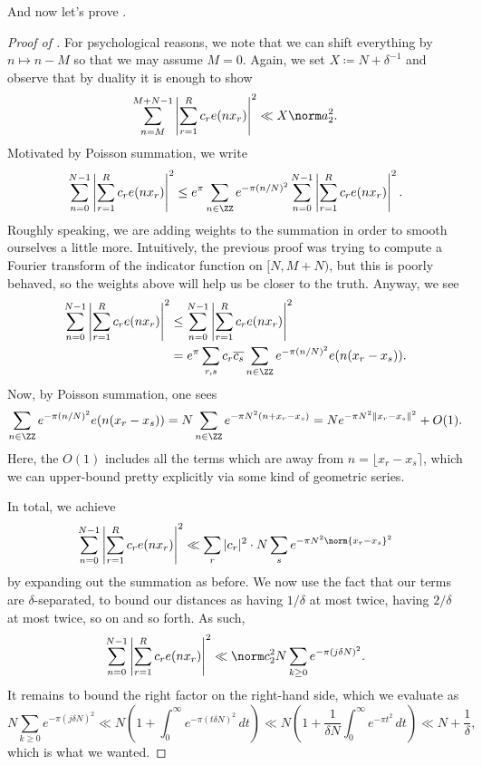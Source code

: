 \documentclass[../notes.tex]{subfiles}
\begin{document}
And now let's prove .
\begin{proof}[Proof of ]
	For psychological reasons, we note that we can shift everything by $n\mapsto n-M$ so that we may assume $M=0$. Again, we set $X\coloneqq N+\delta^{-1}$ and observe that by duality it is enough to show
	\[\sum_{n=M}^{M+N-1}\left|\sum_{r=1}^Rc_re(nx_r)\right|^2\ll X\norm a_2^2.\]
	Motivated by Poisson summation, we write
	\[\sum_{n=0}^{N-1}\left|\sum_{r=1}^Rc_re(nx_r)\right|^2\le e^\pi\sum_{n\in\ZZ}e^{-\pi(n/N)^2}\sum_{n=0}^{N-1}\left|\sum_{r=1}^Rc_re(nx_r)\right|^2.\]
	Roughly speaking, we are adding weights to the summation in order to smooth ourselves a little more. Intuitively, the previous proof was trying to compute a Fourier transform of the indicator function on $[N,M+N)$, but this is poorly behaved, so the weights above will help us be closer to the truth. Anyway, we see
	\begin{align*}
		\sum_{n=0}^{N-1}\left|\sum_{r=1}^Rc_re(nx_r)\right|^2 &\le \sum_{n=0}^{N-1}\left|\sum_{r=1}^Rc_re(nx_r)\right|^2 \\
		&= e^\pi\sum_{r,s}c_r\overline{c_s}\sum_{n\in\ZZ}e^{-\pi(n/N)^2}e(n(x_r-x_s)).
	\end{align*}
	Now, by Poisson summation, one sees
	\[\sum_{n\in\ZZ}e^{-\pi(n/N)^2}e(n(x_r-x_s))=N\sum_{n\in\ZZ}e^{-\pi N^2(n+x_r-x_s)}=Ne^{-\pi N^2\lVert x_r-x_s\rVert^2}+O(1).\]
	Here, the $O(1)$ includes all the terms which are away from $n=\lfloor x_r-x_s\rceil$, which we can upper-bound pretty explicitly via some kind of geometric series. 

	In total, we achieve
	\[\sum_{n=0}^{N-1}\left|\sum_{r=1}^Rc_re(nx_r)\right|^2\ll\sum_r|c_r|^2\cdot N\sum_se^{-\pi N^2\norm{x_r-x_s}^2}\]
	by expanding out the summation as before. We now use the fact that our terms are $\delta$-separated, to bound our distances as having $1/\delta$ at most twice, having $2/\delta$ at most twice, so on and so forth. As such,
	\[\sum_{n=0}^{N-1}\left|\sum_{r=1}^Rc_re(nx_r)\right|^2\ll\norm c_2^2N\sum_{k\ge0}e^{-\pi (j\delta N)^2}.\]
	It remains to bound the right factor on the right-hand side, which we evaluate as
	\[N\sum_{k\ge0}e^{-\pi(j\delta N)^2}\ll N\left(1+\int_0^\infty e^{-\pi(t\delta N)^2}\,dt\right)\ll N\left(1+\frac1{\delta N}\int_0^\infty e^{-\pi t^2}\,dt\right)\ll N+\frac1\delta,\]
	which is what we wanted.
\end{proof}
\end{document}
